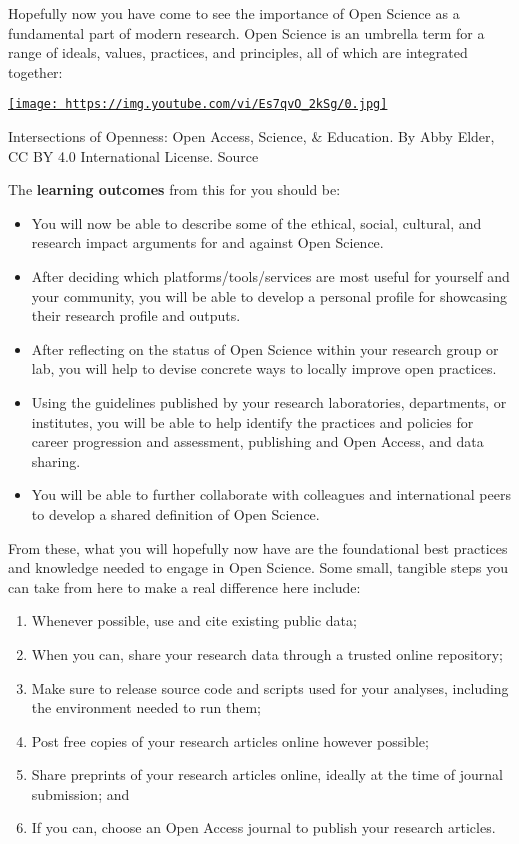 \documentclass[]{book}
\begin{document}
Hopefully now you have come to see the importance of Open Science as a fundamental part of modern research. Open Science is an umbrella term for a range of ideals, values, practices, and principles, all of which are integrated together:

\href{https://www.youtube.com/watch?v=Es7qvO_2kSg}{\texttt{[image: https://img.youtube.com/vi/Es7qvO\_2kSg/0.jpg]}}

Intersections of Openness: Open Access, Science, \& Education. By Abby Elder, CC BY 4.0 International License. Source

The \textbf{learning outcomes} from this for you should be:

\begin{itemize}
\item
  You will now be able to describe some of the ethical, social, cultural, and research impact arguments for and against Open Science.
\item
  After deciding which platforms/tools/services are most useful for yourself and your community, you will be able to develop a personal profile for showcasing their research profile and outputs.
\item
  After reflecting on the status of Open Science within your research group or lab, you will help to devise concrete ways to locally improve open practices.
\item
  Using the guidelines published by your research laboratories, departments, or institutes, you will be able to help identify the practices and policies for career progression and assessment, publishing and Open Access, and data sharing.
\item
  You will be able to further collaborate with colleagues and international peers to develop a shared definition of Open Science.
\end{itemize}

From these, what you will hopefully now have are the foundational best practices and knowledge needed to engage in Open Science. Some small, tangible steps you can take from here to make a real difference here include:

\begin{enumerate}
\def\labelenumi{\arabic{enumi}.}
\item
  Whenever possible, use and cite existing public data;
\item
  When you can, share your research data through a trusted online repository;
\item
  Make sure to release source code and scripts used for your analyses, including the environment needed to run them;
\item
  Post free copies of your research articles online however possible;
\item
  Share preprints of your research articles online, ideally at the time of journal submission; and
\item
  If you can, choose an Open Access journal to publish your research articles.
\end{enumerate}
\end{document}
